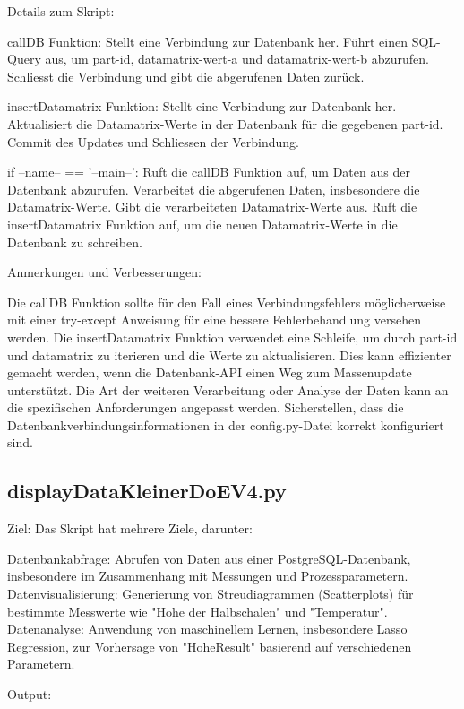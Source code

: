 Details zum Skript:

    callDB Funktion:
        Stellt eine Verbindung zur Datenbank her.
        Führt einen SQL-Query aus, um part-id, datamatrix-wert-a und datamatrix-wert-b abzurufen.
        Schliesst die Verbindung und gibt die abgerufenen Daten zurück.

    insertDatamatrix Funktion:
        Stellt eine Verbindung zur Datenbank her.
        Aktualisiert die Datamatrix-Werte in der Datenbank für die gegebenen part-id.
        Commit des Updates und Schliessen der Verbindung.

    if --name-- == '--main--':
        Ruft die callDB Funktion auf, um Daten aus der Datenbank abzurufen.
        Verarbeitet die abgerufenen Daten, insbesondere die Datamatrix-Werte.
        Gibt die verarbeiteten Datamatrix-Werte aus.
        Ruft die insertDatamatrix Funktion auf, um die neuen Datamatrix-Werte in die Datenbank zu schreiben.

Anmerkungen und Verbesserungen:

    Die callDB Funktion sollte für den Fall eines Verbindungsfehlers möglicherweise mit einer try-except Anweisung für eine bessere Fehlerbehandlung versehen werden.
    Die insertDatamatrix Funktion verwendet eine Schleife, um durch part-id und datamatrix zu iterieren und die Werte zu aktualisieren. Dies kann effizienter gemacht werden, wenn die Datenbank-API einen Weg zum Massenupdate unterstützt.
    Die Art der weiteren Verarbeitung oder Analyse der Daten kann an die spezifischen Anforderungen angepasst werden.
    Sicherstellen, dass die Datenbankverbindungsinformationen in der config.py-Datei korrekt konfiguriert sind.

    \subsection{displayDataKleinerDoEV4.py}

    Ziel:
Das Skript hat mehrere Ziele, darunter:

    Datenbankabfrage: Abrufen von Daten aus einer PostgreSQL-Datenbank, insbesondere im Zusammenhang mit Messungen und Prozessparametern.
    Datenvisualisierung: Generierung von Streudiagrammen (Scatterplots) für bestimmte Messwerte wie "Hohe der Halbschalen" und "Temperatur".
    Datenanalyse: Anwendung von maschinellem Lernen, insbesondere Lasso Regression, zur Vorhersage von "HoheResult" basierend auf verschiedenen Parametern.

Output:


